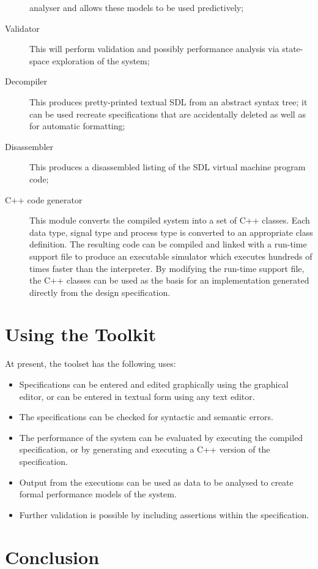 \begin{description}
analyser and allows these models to be used predictively;
\item [Validator] This will perform validation and possibly performance 
analysis via state-space exploration of the system;
\item [Decompiler] This produces pretty-printed textual SDL from
an abstract syntax tree; it can be used recreate specifications that
are accidentally deleted as well as for automatic formatting;
\item [Disassembler] This produces a disassembled listing of the SDL
virtual machine program code;
\item [C++ code generator] This module converts the compiled system
into a set of C++ classes. Each data type, signal type and process type
is converted to an appropriate class definition. The resulting code
can be compiled and linked with a run-time support file to produce
an executable simulator which executes hundreds of times faster than
the interpreter. By modifying the run-time support file, the C++
classes can be used as the basis for an implementation generated
directly from the design specification.
\end{description}

\section{Using the Toolkit}

At present, the toolset has the following uses:

\begin{itemize}
\item Specifications can be entered and edited graphically
using the graphical editor, or can be entered in textual 
form using any text editor.
\item The specifications can be checked for syntactic and semantic
errors.
\item The performance of the system can be evaluated by executing
the compiled specification, or by generating and executing a C++ 
version of the specification.
\item Output from the executions can be used as data to be analysed 
to create formal performance models of the system.
\item Further validation is possible by
including assertions within the specification.
\end{itemize}

\section{Conclusion}

